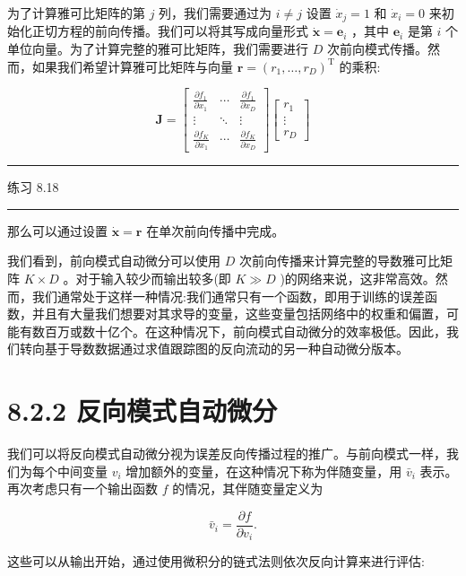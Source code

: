 \documentclass[10pt]{report}
\newcommand{\HRule}{\begin{center}\rule{0.9\linewidth}{0.2mm}\end{center}}
\begin{document}
为了计算雅可比矩阵的第 \(j\) 列，我们需要通过为 \(i \neq  j\) 设置 \({\dot{x}}_{j} = 1\) 和 \({\dot{x}}_{i} = 0\) 来初始化正切方程的前向传播。我们可以将其写成向量形式 \(\dot{\mathbf{x}} = {\mathbf{e}}_{i}\) ，其中 \({\mathbf{e}}_{i}\) 是第 \(i\) 个单位向量。为了计算完整的雅可比矩阵，我们需要进行 \(D\) 次前向模式传播。然而，如果我们希望计算雅可比矩阵与向量 \(\mathbf{r} = {\left( {r}_{1},\ldots ,{r}_{D}\right) }^{\mathrm{T}}\) 的乘积:

\[
\mathbf{J} = \left\lbrack  \begin{matrix} \frac{\partial {f}_{1}}{\partial {x}_{1}} & \cdots & \frac{\partial {f}_{1}}{\partial {x}_{D}} \\  \vdots &  \ddots  & \vdots \\  \frac{\partial {f}_{K}}{\partial {x}_{1}} & \cdots & \frac{\partial {f}_{K}}{\partial {x}_{D}} \end{matrix}\right\rbrack  \left\lbrack  \begin{matrix} {r}_{1} \\  \vdots \\  {r}_{D} \end{matrix}\right\rbrack   \tag{8.67}
\]

\HRule

练习 8.18

\HRule

那么可以通过设置 \(\dot{\mathbf{x}} = \mathbf{r}\) 在单次前向传播中完成。

我们看到，前向模式自动微分可以使用 \(D\) 次前向传播来计算完整的导数雅可比矩阵 \(K \times  D\) 。对于输入较少而输出较多(即 \(K \gg  D\) )的网络来说，这非常高效。然而，我们通常处于这样一种情况:我们通常只有一个函数，即用于训练的误差函数，并且有大量我们想要对其求导的变量，这些变量包括网络中的权重和偏置，可能有数百万或数十亿个。在这种情况下，前向模式自动微分的效率极低。因此，我们转向基于导数数据通过求值跟踪图的反向流动的另一种自动微分版本。

\section*{8.2.2 反向模式自动微分}

我们可以将反向模式自动微分视为误差反向传播过程的推广。与前向模式一样，我们为每个中间变量 \({v}_{i}\) 增加额外的变量，在这种情况下称为伴随变量，用 \({\bar{v}}_{i}\) 表示。再次考虑只有一个输出函数 \(f\) 的情况，其伴随变量定义为

\[
{\bar{v}}_{i} = \frac{\partial f}{\partial {v}_{i}}. \tag{8.68}
\]

这些可以从输出开始，通过使用微积分的链式法则依次反向计算来进行评估:
\end{document}
